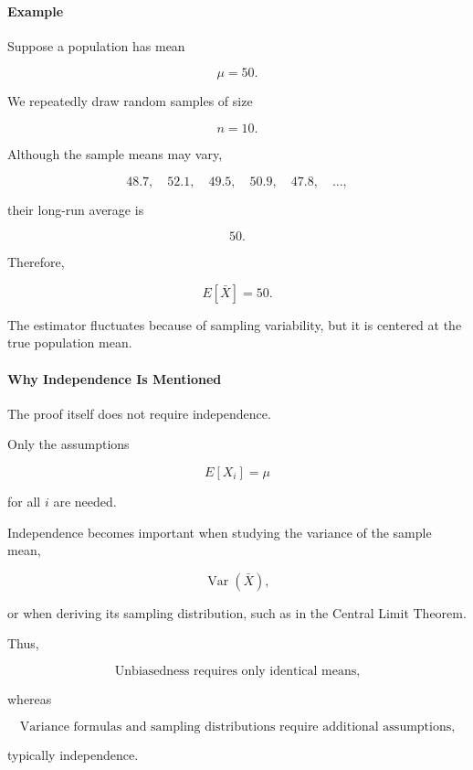 \documentclass[11pt]{article}
\begin{document}
\begin{mdframed}[
		linewidth=0.8pt,
		roundcorner=6pt,
		backgroundcolor=gray!5,
		linecolor=gray!60,
		innertopmargin=10pt,
		innerbottommargin=10pt,
		innerleftmargin=10pt,
		innerrightmargin=10pt
		]
		\bigskip
		
		\paragraph{Example}
		
		Suppose a population has mean
		
		\[
		\mu=50.
		\]
		
		We repeatedly draw random samples of size
		
		\[
		n=10.
		\]
		
		Although the sample means may vary,
		
		\[
		48.7,\quad
		52.1,\quad
		49.5,\quad
		50.9,\quad
		47.8,\quad
		\ldots,
		\]
		
		their long-run average is
		
		\[
		50.
		\]
		
		Therefore,
		
		\[
		E[\bar X]=50.
		\]
		
		The estimator fluctuates because of sampling variability, but it is centered
		at the true population mean.
		
		\bigskip
		
		\paragraph{Why Independence Is Mentioned}
		
		The proof itself does not require independence.
		
		Only the assumptions
		
		\[
		E[X_i]=\mu
		\]
		
		for all \(i\) are needed.
		
		Independence becomes important when studying the variance of the sample
		mean,
		
		\[
		\operatorname{Var}(\bar X),
		\]
		
		or when deriving its sampling distribution, such as in the Central Limit
		Theorem.
		
		Thus,
		
		\[
		\boxed{
			\text{Unbiasedness requires only identical means,}
		}
		\]
		
		whereas
		
		\[
		\boxed{
			\text{Variance formulas and sampling distributions require additional assumptions,}
		}
		\]
		
		typically independence.
		
		\bigskip
		

\end{mdframed}
\end{document}
